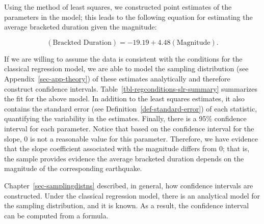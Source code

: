 \documentclass[
  letterpaper,
  DIV=11,
  numbers=noendperiod]{scrreprt}
\theoremstyle{definition}
\theoremstyle{definition}
\theoremstyle{plain}
\theoremstyle{remark}
\begin{document}
Using the method of least squares, we constructed point estimates of the
parameters in the model; this leads to the following equation for
estimating the average bracketed duration given the magnitude:

\[(\text{Brackted Duration}) = -19.19 + 4.48(\text{Magnitude}).\]

If we are willing to assume the data is consistent with the conditions
for the classical regression model, we are able to model the sampling
distribution (see Appendix~\ref{sec-app-theory}) of these estimates
analytically and therefore construct confidence intervals.
Table~\ref{tbl-regconditions-slr-summary} summarizes the fit for the
above model. In addition to the least squares estimates, it also
contains the standard error (see Definition~\ref{def-standard-error}) of
each statistic, quantifying the variability in the estimates. Finally,
there is a 95\% confidence interval for each parameter. Notice that
based on the confidence interval for the slope, 0 is not a reasonable
value for this parameter. Therefore, we have evidence that the slope
coefficient associated with the magnitude differs from 0; that is, the
sample provides evidence the average bracketed duration depends on the
magnitude of the corresponding earthquake.

\begin{table}

\caption{\label{tbl-regconditions-slr-summary}Summary of the linear
model fit relating the bracketed duration at locations in Greece
following an earthquake with the magnitude of the event.}


\end{table}%

Chapter~\ref{sec-samplingdistns} described, in general, how confidence
intervals are constructed. Under the classical regression model, there
is an analytical model for the sampling distribution, and it is known.
As a result, the confidence interval can be computed from a formula.
\end{document}
